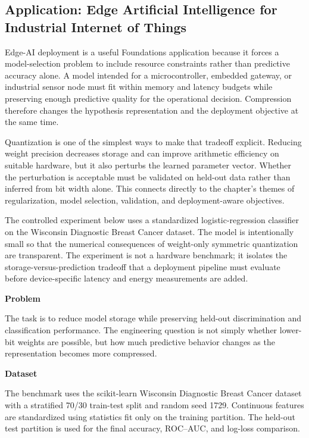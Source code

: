\subsection{Application: Edge Artificial Intelligence for Industrial Internet of Things}

Edge-AI deployment is a useful Foundations application because it forces a model-selection problem to include resource constraints rather than predictive accuracy alone. A model intended for a microcontroller, embedded gateway, or industrial sensor node must fit within memory and latency budgets while preserving enough predictive quality for the operational decision. Compression therefore changes the hypothesis representation and the deployment objective at the same time.

Quantization is one of the simplest ways to make that tradeoff explicit. Reducing weight precision decreases storage and can improve arithmetic efficiency on suitable hardware, but it also perturbs the learned parameter vector. Whether the perturbation is acceptable must be validated on held-out data rather than inferred from bit width alone. This connects directly to the chapter's themes of regularization, model selection, validation, and deployment-aware objectives.

The controlled experiment below uses a standardized logistic-regression classifier on the Wisconsin Diagnostic Breast Cancer dataset. The model is intentionally small so that the numerical consequences of weight-only symmetric quantization are transparent. The experiment is not a hardware benchmark; it isolates the storage-versus-prediction tradeoff that a deployment pipeline must evaluate before device-specific latency and energy measurements are added.

\textbf{Problem}

The task is to reduce model storage while preserving held-out discrimination and classification performance. The engineering question is not simply whether lower-bit weights are possible, but how much predictive behavior changes as the representation becomes more compressed.

\textbf{Dataset}

The benchmark uses the scikit-learn Wisconsin Diagnostic Breast Cancer dataset with a stratified 70/30 train-test split and random seed 1729. Continuous features are standardized using statistics fit only on the training partition. The held-out test partition is used for the final accuracy, ROC--AUC, and log-loss comparison.


